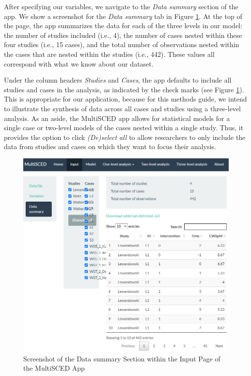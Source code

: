 \documentclass[
]{book}
\begin{document}
After specifying our variables, we navigate to the \emph{Data summary} section of the app. We show a screenshot for the \emph{Data summary} tab in Figure \ref{fig:MultiSCED-input-datasummary-Lewandowski}. At the top of the page, the app summarizes the data for each of the three levels in our model: the number of studies included (i.e., 4), the number of cases nested within these four studies (i.e., 15 cases), and the total number of observations nested within the cases that are nested within the studies (i.e., 442). These values all correspond with what we know about our dataset.

Under the column headers \emph{Studies} and \emph{Cases}, the app defaults to include all studies and cases in the analysis, as indicated by the check marks (see Figure \ref{fig:MultiSCED-input-datasummary-Lewandowski}). This is appropriate for our application, because for this methods guide, we intend to illustrate the synthesis of data across all cases and studies using a three-level analysis. As an aside, the MultiSCED app allows for statistical models for a single case or two-level models of the cases nested within a single study. Thus, it provides the option to click \emph{(De)select all} to allow researchers to only include the data from studies and cases on which they want to focus their analysis.

\begin{figure}
\includegraphics[width=0.6\linewidth]{images/MultiSCED_input.datasummary_Lewandowski2011} \caption{Screenshot of the Data summary Section within the Input Page of the MultiSCED App}\label{fig:MultiSCED-input-datasummary-Lewandowski}
\end{figure}
\end{document}
